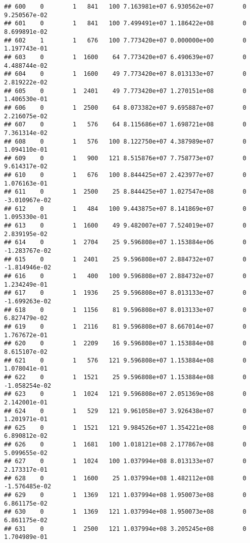 \documentclass[
]{article}
\begin{document}
\begin{enumerate}
\begin{verbatim}
## 600    0        1   841   100 7.163981e+07 6.930562e+07        0  9.250567e-02
## 601    0        1   841   100 7.499491e+07 1.186422e+08        0  8.699891e-02
## 602    1        1   676   100 7.773420e+07 0.000000e+00        0  1.197743e-01
## 603    0        1  1600    64 7.773420e+07 6.490639e+07        0  4.488744e-02
## 604    0        1  1600    49 7.773420e+07 8.013133e+07        0  2.819222e-02
## 605    0        1  2401    49 7.773420e+07 1.270151e+08        0  1.406530e-01
## 606    0        1  2500    64 8.073382e+07 9.695887e+07        0  2.216075e-02
## 607    0        1   576    64 8.115686e+07 1.698721e+08        0  7.361314e-02
## 608    0        1   576   100 8.122750e+07 4.387989e+07        0  1.094110e-01
## 609    0        1   900   121 8.515876e+07 7.758773e+07        0  9.614317e-02
## 610    0        1   676   100 8.844425e+07 2.423977e+07        0  1.076163e-01
## 611    0        1  2500    25 8.844425e+07 1.027547e+08        0 -3.010967e-02
## 612    0        1   484   100 9.443875e+07 8.141869e+07        0  1.095330e-01
## 613    0        1  1600    49 9.482007e+07 7.524019e+07        0  2.839195e-02
## 614    0        1  2704    25 9.596808e+07 1.153884e+06        0 -1.283767e-02
## 615    0        1  2401    25 9.596808e+07 2.884732e+07        0 -1.814946e-02
## 616    0        1   400   100 9.596808e+07 2.884732e+07        0  1.234249e-01
## 617    0        1  1936    25 9.596808e+07 8.013133e+07        0 -1.699263e-02
## 618    0        1  1156    81 9.596808e+07 8.013133e+07        0  6.827479e-02
## 619    0        1  2116    81 9.596808e+07 8.667014e+07        0  1.767672e-01
## 620    0        1  2209    16 9.596808e+07 1.153884e+08        0  8.615107e-02
## 621    0        1   576   121 9.596808e+07 1.153884e+08        0  1.078041e-01
## 622    0        1  1521    25 9.596808e+07 1.153884e+08        0 -1.058254e-02
## 623    0        1  1024   121 9.596808e+07 2.051369e+08        0  2.142001e-01
## 624    0        1   529   121 9.961058e+07 3.926438e+07        0  1.201971e-01
## 625    0        1  1521   121 9.984526e+07 1.354221e+08        0  6.890812e-02
## 626    0        1  1681   100 1.018121e+08 2.177867e+08        0  5.099655e-02
## 627    0        1  1024   100 1.037994e+08 8.013133e+07        0  2.173317e-01
## 628    0        1  1600    25 1.037994e+08 1.482112e+08        0 -1.576485e-02
## 629    0        1  1369   121 1.037994e+08 1.950073e+08        0  6.861175e-02
## 630    0        1  1369   121 1.037994e+08 1.950073e+08        0  6.861175e-02
## 631    0        1  2500   121 1.037994e+08 3.205245e+08        0  1.704989e-01

\end{verbatim}
\end{enumerate}
\end{document}
